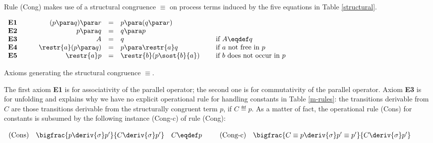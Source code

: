 Rule (Cong) makes use of a structural congruence $\equiv$ on process terms induced by the 
five equations in Table \ref{structural}.

\begin{table}[t]
{\renewcommand{\arraystretch}{1.8}
\normalsize{

\begin{center}

\hrulefill

$\begin{array}{llrclllrrl}
{\bf E1} &\; \; &\; \;  (p \para q) \para r & = & p \para (q \para r) \\
{\bf E2} &\; \; &\; \; p \para q & = & q \para p \\
{\bf E3} &\; \; &\; \; A & = & q & \quad \mbox{ if $A \eqdef q$}\\
{\bf E4} &\; \; &\; \; \restr{a} (p \para q)  & = & p \para \restr{a}q &  \quad \mbox{ if $a$ not free in $p$}\\
{\bf E5} &\; \; &\; \; \restr{a} p & = &  \restr{b} (p\sost{b}{a}) & \quad \mbox{ if $b$ does not occur in $p$}\\
\end{array}$


\hrulefill

\end{center}}
}
\caption{Axioms generating the structural congruence $\equiv$.}\label{structural}
\end{table}


The first axiom {\bf E1} is for associativity of the parallel operator; the second one is for commutativity
of the parallel operator. Axiom {\bf E3} is for unfolding and explains 
why we have no explicit operational rule for handling constants in Table \ref{m-rules}: the transitions derivable from $C$
are those transitions derivable from the structurally congruent term $p$, if $C \eqdef p$. As a matter
of fact, the operational rule (Cons) for constants is subsumed by the following instance (Cong-c) of rule (Cong):

$\begin{array}{lcllcl}
\mbox{(Cons)} & \bigfrac{p \deriv{\sigma}p'}{C\deriv{\sigma}p'}  & C\eqdef p & & \; \; 
\mbox{(Cong-c)}  & \bigfrac{C \equiv p\deriv{\sigma}p' \equiv p'}{C\deriv{\sigma}p'} \\
\end{array}$

